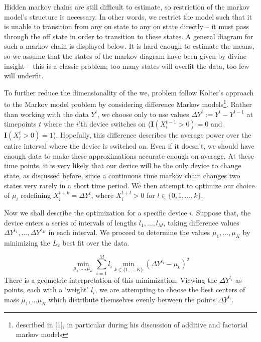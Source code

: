 \documentclass{article}
\begin{document}
Hidden markov chains are still difficult to estimate, so restriction of the markov model's structure is necessary. In other words, we restrict the model such that it is unable to transition from any on state to any on state directly -- it must pass through the off state in order to transition to these states. A general diagram for such a markov chain is displayed below. It is hard enough to estimate the means, so we assume that the states of the markov diagram have been given by divine insight -- this is a classic problem; too many states will overfit the data, too few will underfit.

To further reduce the dimensionality of the we, problem follow Kolter's approach to the Markov model problem by considering difference Markov models\footnote{described in [1], in particular during his discussion of additive and factorial markov models}. Rather than working with the data $Y^t$, we choose only to use values $\Delta Y^t := Y^t - Y^{t-1}$ at timepoints $t$ where the $i$'th device switches on ($\mathbf{I}(X_i^{t-1} > 0) = 0$ and $\mathbf{I}(X_i^t > 0) = 1$). Hopefully, this difference describes the average power over the entire interval where the device is switched on. Even if it doesn't, we should have enough data to make these approximations accurate enough on average. At these time points, it is very likely that our device will be the only device to change state, as discussed before, since a continuous time markov chain changes two states very rarely in a short time period. We then attempt to optimize our choice of $\mu_i$ redefining $X_i^{t + k} = \Delta Y^t$, where $X_i^{t + l} > 0$ for $l \in \{0, 1, \dots, k\}$.

Now we shall describe the optimization for a specific device $i$. Suppose that, the device enters a series of intervals of lengths $l_1, \dots, l_M$, taking difference values $\Delta Y^{t_1}, \dots, \Delta Y^{t_M}$ in each interval. We proceed to determine the values $\mu_1, \dots, \mu_K$ by minimizing the $L_2$ best fit over the data.

%
\begin{equation} \min_{\mu_1, \dots, \mu_K} \sum_{i = 1}^M l_i \min_{k \in \{ 1, \dots, K \}}(\Delta Y^{t_i} - \mu_k)^2 \end{equation}
%
There is a geometric interpretation of this minimization. Viewing the $\Delta Y^{t_i}$ as points, each with a `weight' $l_i$, we are attempting to choose the best centers of mass $\mu_1, \dots \mu_K$ which distribute themselves evenly between the points $\Delta Y^{t_i}$.
\end{document}
